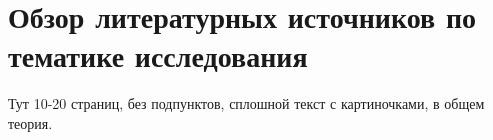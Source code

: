 \section{Обзор литературных источников по тематике исследования} \label{literature}

Тут 10-20 страниц, без подпунктов, сплошной текст с картиночками, в общем теория.

\clearpage
